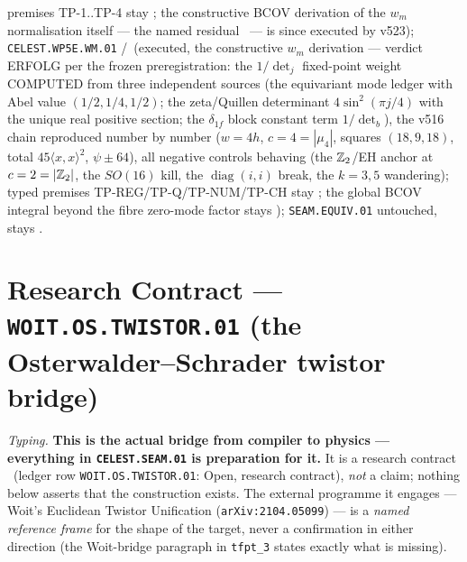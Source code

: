 premises TP-1..TP-4 stay \mC; the constructive BCOV derivation of the $w_m$ normalisation
itself --- the named residual \mO\ --- is since executed by v523);
\texttt{CELEST.WP5E.WM.01} \mE/\mC\ (executed, the constructive $w_m$ derivation --- verdict
ERFOLG per the frozen preregistration: the $1/\det_j$ fixed-point weight COMPUTED from three
independent sources (the equivariant mode ledger with Abel value $(1/2,1/4,1/2)$; the
zeta/Quillen determinant $4\sin^2(\pi j/4)$ with the unique real positive section; the
$\delta_{1f}$ block constant term $1/\det_b$), the v516 chain reproduced number by number
($w=4h$, $c=4=|\mu_4|$, squares $(18,9,18)$, total $45\langle x,x\rangle^2$, $\psi\pm64$),
all negative controls behaving (the $\mathbb Z_2$/EH anchor at $c=2=|\mathbb Z_2|$, the $SO(16)$ kill, the
$\operatorname{diag}(i,i)$ break, the $k=3,5$ wandering); typed premises
TP-REG/TP-Q/TP-NUM/TP-CH stay \mC; the global BCOV integral beyond the fibre zero-mode factor
stays \mO);
\texttt{SEAM.EQUIV.01} untouched, stays \mO.

\section*{Research Contract --- \texttt{WOIT.OS.TWISTOR.01} (the Osterwalder--Schrader twistor bridge)}
\noindent\emph{Typing.} \textbf{This is the actual bridge from compiler to physics --- everything in
\texttt{CELEST.SEAM.01} is preparation for it.} It is a research contract \mO\ (ledger row
\texttt{WOIT.OS.TWISTOR.01}: Open, research contract), \emph{not} a claim; nothing below asserts
that the construction exists. The external programme it engages --- Woit's Euclidean Twistor
Unification (\texttt{arXiv:2104.05099}) --- is a \emph{named reference frame} for the shape of the
target, never a confirmation in either direction (the Woit-bridge paragraph in \texttt{tfpt\_3}
states exactly what is missing).

